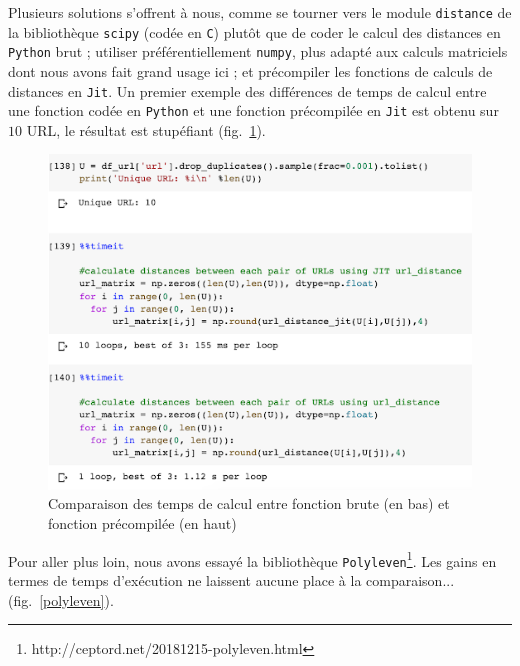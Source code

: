 \documentclass[11pt, a4paper]{article}
\begin{document}
Plusieurs solutions s'offrent à nous, comme se tourner vers le module \texttt{distance} de la bibliothèque \texttt{scipy} (codée en \texttt{C}) plutôt que de coder le calcul des distances en \texttt{Python} brut ; utiliser préférentiellement \texttt{numpy}, plus adapté aux calculs matriciels dont nous avons fait grand usage ici ; et précompiler les fonctions de calculs de distances en \texttt{Jit}. Un premier exemple des différences de temps de calcul entre une fonction codée en \texttt{Python} et une fonction précompilée en \texttt{Jit} est obtenu sur $10$ URL, le résultat est stupéfiant (fig.~\ref{times}).

\begin{figure}[!h]
	\center
	\includegraphics[scale=0.5]{times.png}
	\caption{Comparaison des temps de calcul entre fonction brute (en bas) et fonction précompilée (en haut)}
	\label{times}
\end{figure}

Pour aller plus loin, nous avons essayé la bibliothèque \texttt{Polyleven}\footnote{http://ceptord.net/20181215-polyleven.html}. Les gains en termes de temps d'exécution ne laissent aucune place à la comparaison... (fig.~\ref{polyleven}).
\end{document}
